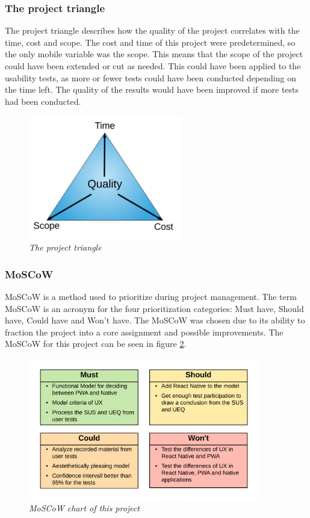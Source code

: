 \subsubsection{The project triangle}
The project triangle describes how the quality of the project correlates with the time, cost and scope. The cost and time of this project were predetermined, so the only mobile variable was the scope. This means that the scope of the project could have been extended or cut as needed. This could have been applied to the usability tests, as more or fewer tests could have been conducted depending on the time left. The quality of the results would have been improved if more tests had been conducted.

\begin{figure}[ht]
	\centering 
    \includegraphics[width=0.6\textwidth]{img/project_triangle.png}
	\hfill
	\caption{\textit{The project triangle}}
	\label{fig:project_triangle}
\end{figure}

\subsubsection{MoSCoW}

MoSCoW is a method used to prioritize during project management. The term MoSCoW is an acronym for the four prioritization categories: Must have, Should have, Could have and Won’t have. The MoSCoW was chosen due to its ability to fraction the project into a core assignment and possible improvements. 
The MoSCoW for this project can be seen in figure  \ref{fig:MoSCoW}.

\begin{figure}[ht]
	\centering 
    \includegraphics[width=0.9\textwidth]{img/moscow.png}
	\hfill
	\caption{\textit{MoSCoW chart of this project}}
	\label{fig:MoSCoW}
\end{figure}

